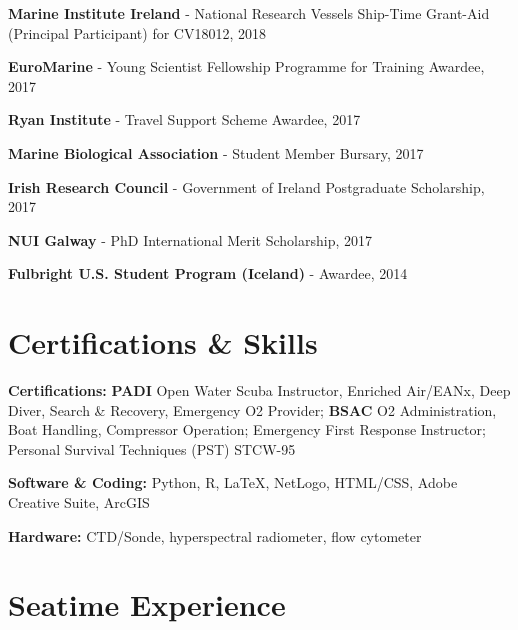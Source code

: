 \documentclass[a4paper]{deedy-resume} %
\begin{document}
\begin{flushleft}
\begin{tightitemize}
\item \textbf{Marine Institute Ireland} - National Research Vessels Ship-Time Grant-Aid (Principal Participant) for CV18012, 2018
\item \textbf{EuroMarine} - Young Scientist Fellowship Programme for Training Awardee, 2017
\item \textbf{Ryan Institute} - Travel Support Scheme Awardee, 2017
\item \textbf{Marine Biological Association} - Student Member Bursary, 2017
\item \textbf{Irish Research Council} - Government of Ireland Postgraduate Scholarship, 2017
\item \textbf{NUI Galway} - PhD International Merit Scholarship, 2017
\item \textbf{Fulbright U.S. Student Program (Iceland)} - Awardee, 2014
\end{tightitemize}

\sectionspace %



\section{Certifications \& Skills}
\sectionspace

\begin{tightitemize}
\item \textbf{Certifications:} \textbf{PADI} Open Water Scuba Instructor, Enriched Air/EANx, Deep Diver, Search \& Recovery, Emergency O2 Provider; \textbf{BSAC} O2 Administration, Boat Handling, Compressor Operation; Emergency First Response Instructor; Personal Survival Techniques (PST) STCW-95 %
\item \textbf{Software \& Coding:} Python, R, \LaTeX, NetLogo, HTML/CSS, Adobe Creative Suite, ArcGIS
\item \textbf{Hardware:} CTD/Sonde, hyperspectral radiometer, flow cytometer
\end{tightitemize}

\sectionspace %



\section{Seatime Experience}
\sectionspace


\end{flushleft}
\end{document}
